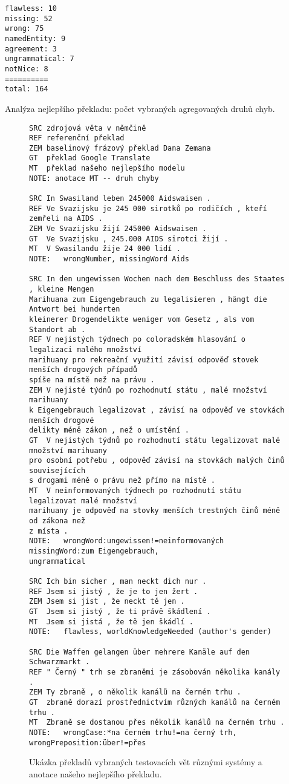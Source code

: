 \documentclass[a4]{article}
\begin{document}
\begin{table}[htpb]
\begin{verbatim}
flawless: 10
missing: 52
wrong: 75
namedEntity: 9
agreement: 3
ungrammatical: 7
notNice: 8
==========
total: 164
\end{verbatim}
\caption{Analýza nejlepšího překladu: počet vybraných agregovaných druhů chyb.}
\label{tab:chyby2}
\end{table}




\begin{figure}[t]
\centering
\begin{verbatim}
SRC	zdrojová věta v němčině
REF referenční překlad
ZEM	baselinový frázový překlad Dana Zemana
GT	překlad Google Translate  
MT	překlad našeho nejlepšího modelu
NOTE: anotace MT -- druh chyby

SRC In Swasiland leben 245000 Aidswaisen .
REF Ve Svazijsku je 245 000 sirotků po rodičích , kteří zemřeli na AIDS .
ZEM Ve Svazijsku žijí 245000 Aidswaisen .
GT  Ve Svazijsku , 245.000 AIDS sirotci žijí .
MT  V Swasilandu žije 24 000 lidí .
NOTE:   wrongNumber, missingWord Aids

SRC In den ungewissen Wochen nach dem Beschluss des Staates , kleine Mengen
Marihuana zum Eigengebrauch zu legalisieren , hängt die Antwort bei hunderten
kleinerer Drogendelikte weniger vom Gesetz , als vom Standort ab .
REF V nejistých týdnech po coloradském hlasování o legalizaci malého množství
marihuany pro rekreační využití závisí odpověď stovek menších drogových případů
spíše na místě než na právu .
ZEM V nejisté týdnů po rozhodnutí státu , malé množství marihuany
k Eigengebrauch legalizovat , závisí na odpověď ve stovkách menších drogové
delikty méně zákon , než o umístění .
GT  V nejistých týdnů po rozhodnutí státu legalizovat malé množství marihuany
pro osobní potřebu , odpověď závisí na stovkách malých činů souvisejících
s drogami méně o právu než přímo na místě .
MT  V neinformovaných týdnech po rozhodnutí státu legalizovat malé množství
marihuany je odpověď na stovky menších trestných činů méně od zákona než
z místa .
NOTE:   wrongWord:ungewissen!=neinformovaných missingWord:zum Eigengebrauch,
ungrammatical

SRC Ich bin sicher , man neckt dich nur .
REF Jsem si jistý , že je to jen žert .
ZEM Jsem si jist , že neckt tě jen .
GT  Jsem si jistý , že ti právě škádlení .
MT  Jsem si jistá , že tě jen škádlí .
NOTE:   flawless, worldKnowledgeNeeded (author's gender)

SRC Die Waffen gelangen über mehrere Kanäle auf den Schwarzmarkt .
REF " Černý " trh se zbraněmi je zásobován několika kanály .
ZEM Ty zbraně , o několik kanálů na černém trhu .
GT  zbraně dorazí prostřednictvím různých kanálů na černém trhu .
MT  Zbraně se dostanou přes několik kanálů na černém trhu .
NOTE:   wrongCase:*na černém trhu!=na černý trh, wrongPreposition:über!=přes
\end{verbatim}
\caption{Ukázka překladů vybraných testovacích vět různými systémy a anotace našeho nejlepšího překladu.}
\label{fig:preklad}
\end{figure}
\end{document}
